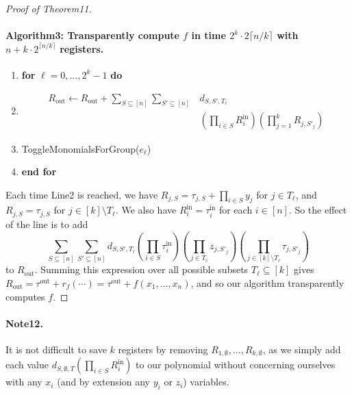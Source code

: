 \begin{proof}[Proof of Theorem11]
\paragraph{Algorithm3: Transparently compute $f$ in time $2^k\cdot2\lceil n/k\rceil$ with $n+k\cdot2^{\lceil n/k\rceil}$ registers.}
\begin{enumerate}[label=\arabic*:]
\item \textbf{for} $\ell=0,\ldots,2^k-1$ \textbf{do}
\item \[\begin{aligned}R_{\mathrm{out}}\leftarrow R_{\mathrm{out}}+\sum_{S\subseteq[n]}\sum_{S'\subseteq[n]}&d_{S,S',T_{\ell}}\\
&\mathord{}(\prod_{i\in S}R_i^{\mathrm{in}})(\prod_{j=1}^kR_{j,S'_j})\end{aligned}\]
\item ToggleMonomialsForGroup($e_{\ell}$)
\item \textbf{end for}
\end{enumerate}
Each time Line2 is reached, we have $R_{j,S}=\tau_{j,S}+\prod_{i\in S}y_j$ for $j\in T_{\ell}$, and $R_{j,S}=\tau_{j,S}$ for $j\in[k]\setminus T_{\ell}$. We also have $R_i^{\mathrm{in}}=\tau_i^{\mathrm{in}}$ for each $i\in[n]$. So the effect of the line is to add
\[\sum_{S\subseteq[n]}\sum_{S'\subseteq[n]}d_{S,S',T_{\ell}}\left(\prod_{i\in S}\tau_i^{\mathrm{in}}\right)\left(\prod_{j\in T_{\ell}}z_{j,S'_j}\right)\left(\prod_{j\in[k]\setminus T_{\ell}}\tau_{j,S'_j}\right)\]
to $R_{\mathrm{out}}$. Summing this expression over all possible subsets $T_{\ell}\subseteq[k]$ gives $R_{\mathrm{out}}=\tau^{\mathrm{out}}+r_f(\cdots)=\tau^{\mathrm{out}}+f(x_1,\ldots,x_n)$, and so our algorithm transparently computes $f$.
\end{proof}
\paragraph{Note12.} It is not difficult to save $k$ registers by removing $R_{1,\emptyset},\ldots,R_{k,\emptyset}$, as we simply add each value $d_{S,\emptyset,T}(\prod_{i\in S}R_i^{\mathrm{in}})$ to our polynomial without concerning ourselves with any $x_i$ (and by extension any $y_i$ or $z_i$) variables.
